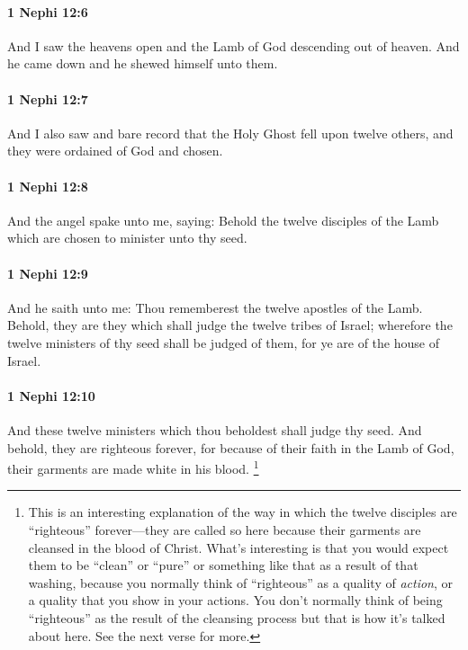 		\paragraph{1 Nephi 12:6} %
			\label{1NEPHI-12-6}

			And I saw the heavens open
			and the Lamb of God descending out of heaven.
			And he came down and he shewed himself unto them.

		\paragraph{1 Nephi 12:7} %
			\label{1NEPHI-12-7}

			And I also saw and bare record
			that the Holy Ghost fell upon twelve others,
			and they were ordained of God and chosen.

		\paragraph{1 Nephi 12:8} %
			\label{1NEPHI-12-8}

			And the angel spake unto me, saying:
			Behold the twelve disciples of the Lamb
			which are chosen to minister unto thy seed.

		\paragraph{1 Nephi 12:9} %
			\label{1NEPHI-12-9}

			And he saith unto me:
			Thou rememberest the twelve apostles of the Lamb.
			Behold, they are they which shall judge the twelve tribes of Israel;
			wherefore the twelve ministers of thy seed shall be judged of them,
			for ye are of the house of Israel.

		\paragraph{1 Nephi 12:10} %
			\label{1NEPHI-12-10}

			And these twelve ministers which thou beholdest shall judge thy seed.
			And behold, they are righteous forever,
			for because of their faith in the Lamb of God,
			their garments are made white in his blood.%
				\footnote{%
					\label{1NEPHI-12-10-NOTE-righteous}%
					This is an interesting explanation of the way in which the twelve disciples are ``righteous'' forever---they are called so here because their garments are cleansed in the blood of Christ. What's interesting is that you would expect them to be ``clean'' or ``pure'' or something like that as a result of that washing, because you normally think of ``righteous'' as a quality of \textit{action}, or a quality that you show in your actions. You don't normally think of being ``righteous'' as the result of the cleansing process but that is how it's talked about here. See the next verse for more.
					}


